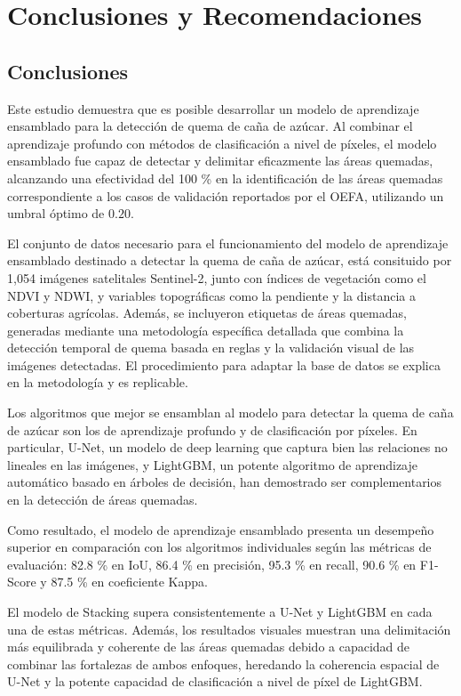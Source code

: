 \section{Conclusiones y Recomendaciones}
\subsection{Conclusiones}

Este estudio demuestra que es posible desarrollar un modelo de aprendizaje ensamblado para la detección 
de quema de caña de azúcar. Al combinar el aprendizaje profundo con métodos de clasificación a nivel de píxeles, 
el modelo ensamblado fue capaz de detectar y delimitar eficazmente las áreas quemadas, alcanzando una efectividad 
del 100 \% en la identificación de las áreas quemadas correspondiente a los casos de validación reportados por el OEFA, 
utilizando un umbral óptimo de $0.20$.

El conjunto de datos necesario para el funcionamiento del modelo de aprendizaje ensamblado destinado a 
detectar la quema de caña de azúcar, está consituido por 1,054 imágenes satelitales Sentinel-2, junto con índices de vegetación 
como el NDVI y NDWI, y variables topográficas como la pendiente y la distancia a coberturas agrícolas. Además, se incluyeron 
etiquetas de áreas quemadas, generadas mediante una metodología específica detallada que combina la detección temporal de quema 
basada en reglas y la validación visual de las imágenes detectadas. El procedimiento para adaptar la base de datos se explica en 
la metodología y es replicable. 

Los algoritmos que mejor se ensamblan al modelo para detectar la quema de caña de azúcar son los de aprendizaje 
profundo y de clasificación por píxeles. En particular, U-Net, un modelo de deep learning que captura bien las relaciones no lineales 
en las imágenes, y LightGBM, un potente algoritmo de aprendizaje automático basado en árboles de decisión, han demostrado ser complementarios en la detección 
de áreas quemadas.

Como resultado, el modelo de aprendizaje ensamblado presenta un desempeño superior en comparación con los algoritmos individuales según las métricas de evaluación: 
82.8 \% en IoU, 86.4 \% en precisión, 95.3 \% en recall, 90.6 \% en F1-Score y 87.5 \% en coeficiente Kappa. 

El modelo de Stacking supera consistentemente a U-Net y LightGBM en cada una de estas 
métricas. Además, los resultados visuales muestran una delimitación más equilibrada y coherente de las áreas quemadas debido a capacidad de combinar las fortalezas de ambos enfoques, heredando la 
coherencia espacial de U-Net y la potente capacidad de clasificación a nivel de píxel de LightGBM.

